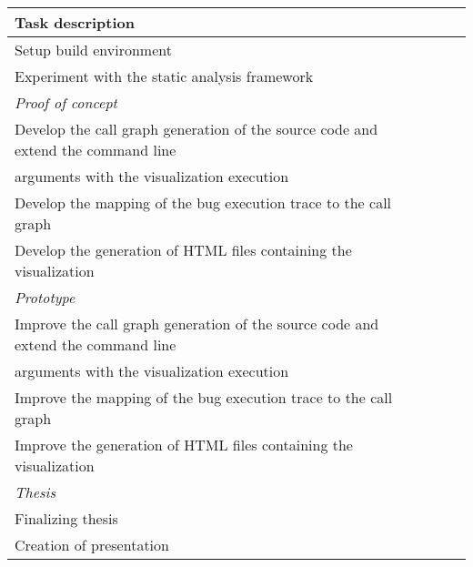 \begin{tabular}{ | l | l | l | l |}
\hline
\textbf{Task description} \\ \hline
Setup build environment \\ \hline
Experiment with the static analysis framework \\ \hline
\textit{Proof of concept} \\ \hline
Develop the call graph generation of the source code and extend the command line \\ arguments with the visualization execution \\ \hline
Develop the mapping of the bug execution trace to the call graph \\ \hline
Develop the generation of HTML files containing the visualization \\ \hline
\textit{Prototype} \\ \hline
Improve the call graph generation of the source code and extend the command line \\ arguments with the visualization execution \\ \hline
Improve the mapping of the bug execution trace to the call graph \\ \hline
Improve the generation of HTML files containing the visualization \\ \hline
\textit{Thesis} \\ \hline
Finalizing thesis \\ \hline
Creation of presentation \\ \hline


\end{tabular}
